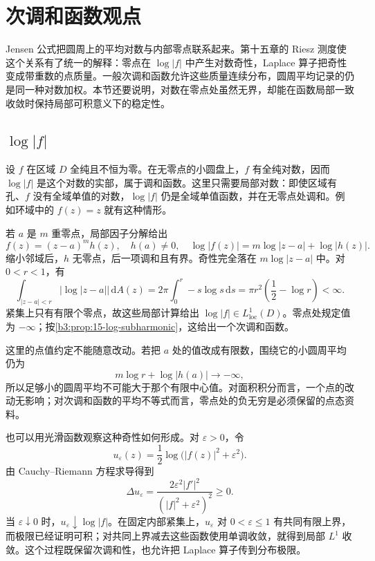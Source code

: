 \section{次调和函数观点}
\label{b3:sec:1803}

Jensen 公式把圆周上的平均对数与内部零点联系起来。第十五章的 Riesz 测度使这个关系有了统一的解释：零点在 \(\log|f|\) 中产生对数奇性，Laplace 算子把奇性变成带重数的点质量。一般次调和函数允许这些质量连续分布，圆周平均记录的仍是同一种对数加权。本节还要说明，对数在零点处虽然无界，却能在函数局部一致收敛时保持局部可积意义下的稳定性。

\subsection{\texorpdfstring{\(\log |f|\)}{log|f|}}
\label{b3:subsec:180301}

设 \(f\) 在区域 \(D\) 全纯且不恒为零。在无零点的小圆盘上，\(f\) 有全纯对数，因而 \(\log|f|\) 是这个对数的实部，属于调和函数。这里只需要局部对数：即使区域有孔、\(f\) 没有全域单值的对数，\(\log|f|\) 仍是全域单值函数，并在无零点处调和。例如环域中的 \(f(z)=z\) 就有这种情形。

若 \(a\) 是 \(m\) 重零点，局部因子分解给出
\[
 f(z)=(z-a)^m h(z),
 \quad h(a)\ne0,
 \quad \log|f(z)|=m\log|z-a|+\log|h(z)|.
\]
缩小邻域后，\(h\) 无零点，后一项调和且有界。奇性完全落在 \(m\log|z-a|\) 中。对 \(0<r<1\)，有
\[
 \int_{|z-a|<r}|\log|z-a||\,\mathrm dA(z)
 =2\pi\int_0^r-s\log s\,\mathrm ds
 =\pi r^2\left(\frac12-\log r\right)<\infty.
\]
紧集上只有有限个零点，故这些局部计算给出 \(\log|f|\in L^1_{\mathrm{loc}}(D)\)。零点处规定值为 \(-\infty\)；按\cref{b3:prop:15-log-subharmonic}，这给出一个次调和函数。

这里的点值约定不能随意改动。若把 \(a\) 处的值改成有限数，围绕它的小圆周平均仍为
\[
 m\log r+\log|h(a)|\longrightarrow-\infty,
\]
所以足够小的圆周平均不可能大于那个有限中心值。对面积积分而言，一个点的改动无影响；对次调和函数的平均不等式而言，零点处的负无穷是必须保留的点态资料。

\ProseParagraphBreak

也可以用光滑函数观察这种奇性如何形成。对 \(\varepsilon>0\)，令
\[
 u_\varepsilon(z)=\frac12\log\bigl(|f(z)|^2+\varepsilon^2\bigr).
\]
由 Cauchy--Riemann 方程求导得到
\[
 \Delta u_\varepsilon
 =\frac{2\varepsilon^2|f'|^2}{(|f|^2+\varepsilon^2)^2}\ge0.
\]
当 \(\varepsilon\downarrow0\) 时，\(u_\varepsilon\downarrow\log|f|\)。在固定内部紧集上，\(u_\varepsilon\) 对 \(0<\varepsilon\le1\) 有共同有限上界，而极限已经证明可积；对共同上界减去这些函数使用单调收敛，就得到局部 \(L^1\) 收敛。这个过程既保留次调和性，也允许把 Laplace 算子传到分布极限。


